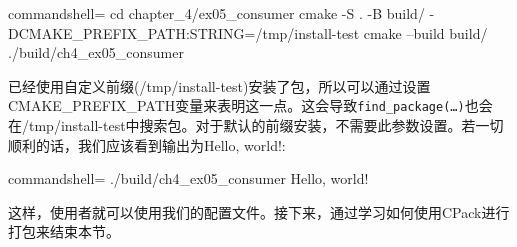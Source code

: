 \begin{tcblisting}{commandshell={}}
cd chapter_4/ex05_consumer
cmake -S . -B build/ -DCMAKE_PREFIX_PATH:STRING=/tmp/install-test
cmake --build build/
./build/ch4_ex05_consumer
\end{tcblisting}

已经使用自定义前缀(/tmp/install-test)安装了包，所以可以通过设置CMAKE\_PREFIX\_PATH变量来表明这一点。这会导致\texttt{find\_package(…)}也会在/tmp/install-test中搜索包。对于默认的前缀安装，不需要此参数设置。若一切顺利的话，我们应该看到输出为Hello, world!: 

\begin{tcblisting}{commandshell={}}
./build/ch4_ex05_consumer
Hello, world!
\end{tcblisting}

这样，使用者就可以使用我们的配置文件。接下来，通过学习如何使用CPack进行打包来结束本节。



























